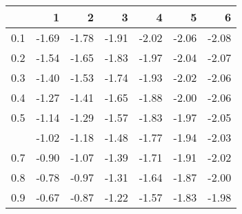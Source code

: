 
\begin{tabular}{lrrrrrr}
\toprule
  & 1 & 2 & 3 & 4 & 5 & 6\\
\midrule
0.1 & -1.69 & -1.78 & -1.91 & -2.02 & -2.06 & -2.08\\
0.2 & -1.54 & -1.65 & -1.83 & -1.97 & -2.04 & -2.07\\
0.3 & -1.40 & -1.53 & -1.74 & -1.93 & -2.02 & -2.06\\
0.4 & -1.27 & -1.41 & -1.65 & -1.88 & -2.00 & -2.06\\
0.5 & -1.14 & -1.29 & -1.57 & -1.83 & -1.97 & -2.05\\
\addlinespace
0.6 & -1.02 & -1.18 & -1.48 & -1.77 & -1.94 & -2.03\\
0.7 & -0.90 & -1.07 & -1.39 & -1.71 & -1.91 & -2.02\\
0.8 & -0.78 & -0.97 & -1.31 & -1.64 & -1.87 & -2.00\\
0.9 & -0.67 & -0.87 & -1.22 & -1.57 & -1.83 & -1.98\\
\bottomrule
\end{tabular}
